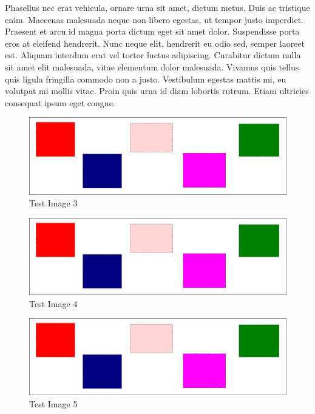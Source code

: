 Phasellus nec erat vehicula, ornare urna sit amet, dictum metus. Duis ac
tristique enim. Maecenas malesuada neque non libero egestas, ut tempor justo
imperdiet. Praesent et arcu id magna porta dictum eget sit amet dolor.
Suspendisse porta eros at eleifend hendrerit. Nunc neque elit, hendrerit eu
odio sed, semper laoreet est. Aliquam interdum erat vel tortor luctus
adipiscing. Curabitur dictum nulla sit amet elit malesuada, vitae elementum
dolor malesuada. Vivamus quis tellus quis ligula fringilla commodo non a justo.
Vestibulum egestas mattis mi, eu volutpat mi mollis vitae. Proin quis urna id
diam lobortis rutrum. Etiam ultricies consequat ipsum eget congue.

\begin{figure}[p]
    \centering
    \includegraphics[width=\textwidth]{figures/test_image}
    \caption{Test Image 3}
    \label{fig:test_image3}
\end{figure}

\begin{figure}[p]
    \centering
    \includegraphics[width=\textwidth]{figures/test_image}
    \caption{Test Image 4}
    \label{fig:test_image4}
\end{figure}

\begin{figure}[p]
    \centering
    \includegraphics[width=\textwidth]{figures/test_image}
    \caption{Test Image 5}
    \label{fig:test_image5}
\end{figure}

